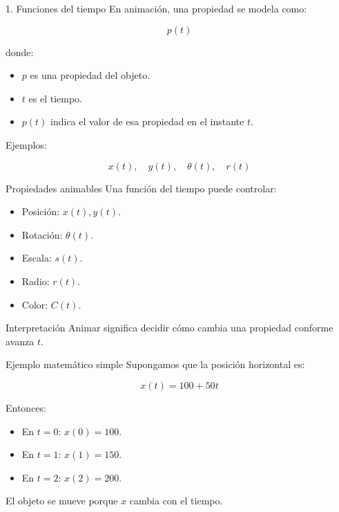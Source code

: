 \documentclass{beamer}
\begin{document}
\begin{frame}{1. Funciones del tiempo}
En animación, una propiedad se modela como:

\[
p(t)
\]

donde:

\begin{itemize}
    \item \(p\) es una propiedad del objeto.
    \item \(t\) es el tiempo.
    \item \(p(t)\) indica el valor de esa propiedad en el instante \(t\).
\end{itemize}

\medskip

Ejemplos:

\[
x(t),\quad y(t),\quad \theta(t),\quad r(t)
\]
\end{frame}

\begin{frame}{Propiedades animables}
Una función del tiempo puede controlar:

\begin{itemize}
    \item Posición: \(x(t), y(t)\).
    \item Rotación: \(\theta(t)\).
    \item Escala: \(s(t)\).
    \item Radio: \(r(t)\).
    \item Color: \(C(t)\).
\end{itemize}

\medskip

\begin{block}{Interpretación}
Animar significa decidir cómo cambia una propiedad conforme avanza \(t\).
\end{block}
\end{frame}

\begin{frame}{Ejemplo matemático simple}
Supongamos que la posición horizontal es:

\[
x(t)=100+50t
\]

\medskip

Entonces:

\begin{itemize}
    \item En \(t=0\): \(x(0)=100\).
    \item En \(t=1\): \(x(1)=150\).
    \item En \(t=2\): \(x(2)=200\).
\end{itemize}

\medskip

El objeto se mueve porque \(x\) cambia con el tiempo.
\end{frame}
\end{document}
